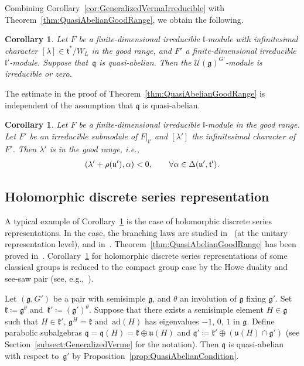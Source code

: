 \documentclass[pdftex]{sigma}
\numberwithin{equation}{section}
\newtheorem{Corollary}[Theorem]{Corollary}
\theoremstyle{definition}
\newcommand{\Hom}{\mathrm{Hom}}
\newcommand{\ad}{\mathrm{ad}}
\newcommand{\lieC}[1]{\mathfrak{#1}}
\newcommand{\lie}[1]{\mathfrak{#1}}
\newcommand{\univ}[1]{\mathcal{U}(\lieC{#1})}
\newcommand{\ind}[2]{\mathrm{ind}^{\lieC{#1}}_{\lieC{#2}}}
\let\Re\relax
\DeclareMathOperator{\Re}{\mathrm{Re}}
\newcommand{\rhog}[1]{\rho(#1)}
\begin{document}
Combining Corollary~\ref{cor:GeneralizedVermaIrreducible} with Theorem~\ref{thm:QuasiAbelianGoodRange}, we obtain the following.

\begin{Corollary}\label{cor:IrreducibleVermaQuasiAbelian}
	Let $F$ be a finite-dimensional irreducible $\lie{l}$-module with infinitesimal character $[\lambda] \in \lie{t}^*/W_L$
	in the good range, and $F'$ a finite-dimensional irreducible $\lie{l}'$-module.
	Suppose that~$\lie{q}$ is quasi-abelian.
	Then the $\univ{g}^{G'}$-module \smash{$\Hom_{\lie{g'}}\bigl(\ind{g'}{q'}(F'), \ind{g}{q}(F)\bigr)$} is irreducible or zero.
\end{Corollary}

The estimate in the proof of Theorem~\ref{thm:QuasiAbelianGoodRange} is independent of the assumption that $\lie{q}$ is quasi-abelian.

\begin{Corollary}%
	Let $F$ be a finite-dimensional irreducible $\lie{l}$-module in the good range.
	Let $F'$ be an irreducible submodule of $F|_{\lie{l}'}$ and $[\lambda']$ the infinitesimal character of $F'$.
	Then $\lambda'$ is in the good range, i.e.,
	\begin{align*}
		\Re(\lambda'+\rhog{\lie{u}'}, \alpha) < 0, \qquad \forall \alpha \in \Delta(\lie{u'}, \lie{t'}).
	\end{align*}
\end{Corollary}

\subsection{Holomorphic discrete series representation}

A typical example of Corollary~\ref{cor:IrreducibleVermaQuasiAbelian} is the case of holomorphic discrete series representations.
In the case, the branching laws are studied in~\cite{JaVe79} (at the unitary representation level),
and in~\mbox{\cite{Ko98,Ko08}}.
Theorem~\ref{thm:QuasiAbelianGoodRange} has been proved in~\cite[Theorem~7.4]{Ko98}.
Corollary~\ref{cor:IrreducibleVermaQuasiAbelian} for holomorphic discrete series representations of some classical groups is reduced to the compact group case by the Howe duality and see-saw pair (see, e.g.,~\cite[Lemma~2.6]{Ma16_dual_pair}).

Let $(\lie{g}, G')$ be a pair with semisimple $\lie{g}$,
and $\theta$ an involution of $\lie{g}$ fixing $\lie{g'}$.
Set $\lie{k}\coloneq \lie{g}^\theta$ and~$\lie{k'}\coloneq (\lie{g'})^\theta$.
Suppose that there exists a semisimple element $H \in \lie{g}$ such that
$H \in \lie{k'}$, $\lie{g}^H = \lie{k}$ and~$\ad(H)$ has eigenvalues $-1$, $0$, $1$ in $\lie{g}$.
Define parabolic subalgebras $\lie{q} = \lie{q}(H) = \lie{k} \oplus \lie{u}(H)$
and $\lie{q'} \coloneq \lie{k}'\oplus (\lie{u}(H)\cap \lie{g'})$ (see Section~\ref{subsect:GeneralizedVerme} for the notation).
Then $\lie{q}$ is quasi-abelian with respect to~$\lie{g'}$ by Proposition~\ref{prop:QuasiAbelianCondition}.
\end{document}
